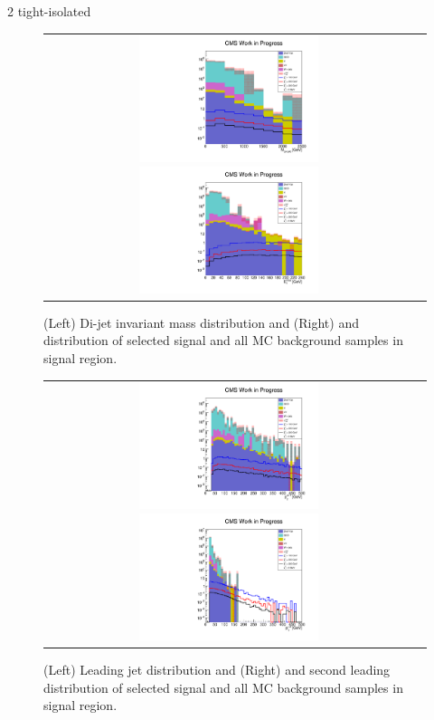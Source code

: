 \FloatBarrier

2 tight-isolated \hadtau

\begin{figure}[tbh!]
	\centering
	\begin{tabular}{cc}
		\includegraphics[width=0.5\textwidth]{analysis/pics/h_dijetinvariantmass_Taui2TightIso.pdf}
		\includegraphics[width=0.5\textwidth]{analysis/pics/h_met_Taui2TightIso.pdf}
	\end{tabular}
	\caption{(Left) Di-jet invariant mass distribution and (Right) and \met distribution of selected signal and all MC background samples in signal region.}
	\label{fig::crplots1_Taui2TightIso_13tev}
\end{figure}

\begin{figure}[tbh!]
	\centering
	\begin{tabular}{cc}
		\includegraphics[width=0.5\textwidth]{analysis/pics/h_jet1pt_Taui2TightIso.pdf}
		\includegraphics[width=0.5\textwidth]{analysis/pics/h_tau2pt_Taui2TightIso.pdf}
	\end{tabular}
	\caption{(Left) Leading jet \pt distribution and (Right) and second leading \hadtau \pt distribution of selected signal and all MC background samples in signal region.}
	\label{fig::crplots2_Taui2TightIso_13tev}
\end{figure}

